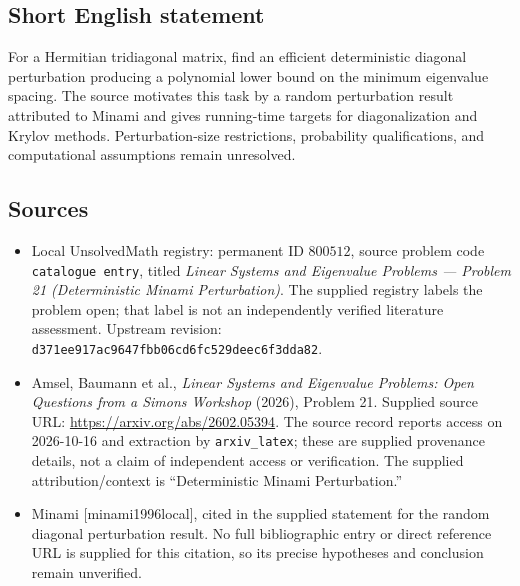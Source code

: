 \documentclass[11pt]{article}
\begin{document}
\subsection{Short English statement}
For a Hermitian tridiagonal matrix, find an efficient deterministic diagonal perturbation producing a polynomial lower bound on the minimum eigenvalue spacing. The source motivates this task by a random perturbation result attributed to Minami and gives running-time targets for diagonalization and Krylov methods. Perturbation-size restrictions, probability qualifications, and computational assumptions remain unresolved.
\subsection{Sources}
\begin{itemize}
\item Local UnsolvedMath registry: permanent ID \(800512\), source problem code \texttt{catalogue entry}, titled \emph{Linear Systems and Eigenvalue Problems --- Problem 21 (Deterministic Minami Perturbation)}. The supplied registry labels the problem open; that label is not an independently verified literature assessment. Upstream revision: \texttt{d371ee917ac9647fbb06cd6fc529deec6f3dda82}.
\item Amsel, Baumann et al., \emph{Linear Systems and Eigenvalue Problems: Open Questions from a Simons Workshop} (2026), Problem 21. Supplied source URL: \url{https://arxiv.org/abs/2602.05394}. The source record reports access on 2026-10-16 and extraction by \texttt{arxiv\_latex}; these are supplied provenance details, not a claim of independent access or verification. The supplied attribution/context is ``Deterministic Minami Perturbation.''
\item Minami [minami1996local], cited in the supplied statement for the random diagonal perturbation result. No full bibliographic entry or direct reference URL is supplied for this citation, so its precise hypotheses and conclusion remain unverified.
\end{itemize}
\end{document}
